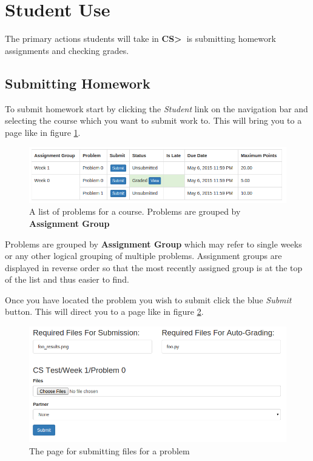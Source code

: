 \documentclass[11pt]{report}
\newcommand{\csgt}[0]{\textbf{CS\textgreater\ }}
\begin{document}
\section{Student Use}
The primary actions students will take in \csgt is submitting homework assignments and checking grades.

\subsection{Submitting Homework}
To submit homework start by clicking the \emph{Student} link on the navigation bar and selecting the course
which you want to submit work to. This will bring you to a page like in figure \ref{fig:problem_list}.

\begin{figure}[h]
\centering
\includegraphics[width=\textwidth,height=\textheight,keepaspectratio]{diagrams/problem_list}
\caption{A list of problems for a course. Problems are grouped by \textbf{Assignment Group}}
\label{fig:problem_list}
\end{figure}

Problems are grouped by \textbf{Assignment Group} which may refer to single weeks or any other logical
grouping of multiple problems. Assignment groups are displayed in reverse order so that the most recently
assigned group is at the top of the list and thus easier to find.

Once you have located the problem you wish to submit click the blue \emph{Submit} button. This will direct 
you to a page like in figure \ref{fig:submit_page}.

\begin{figure}
\centering
\includegraphics[width=\textwidth,height=\textheight,keepaspectratio]{diagrams/submit_page}
\caption{The page for submitting files for a problem}
\label{fig:submit_page}
\end{figure}
\end{document}
